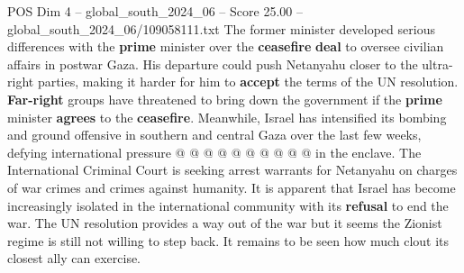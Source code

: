 \begin{textsample}{POS Dim 4 – global\_south\_2024\_06 – Score 25.00 – global\_south\_2024\_06/109058111.txt}
The former minister developed serious differences with the \textbf{prime} minister over the \textbf{ceasefire} \textbf{deal} to oversee civilian affairs in postwar Gaza.
His departure could push Netanyahu closer to the ultra-right parties, making it harder for him to \textbf{accept} the terms of the UN resolution. \textbf{Far-right} groups have threatened to bring down the government if the \textbf{prime} minister \textbf{agrees} to the \textbf{ceasefire}.
Meanwhile, Israel has intensified its bombing and ground offensive in southern and central Gaza over the last few weeks, defying international pressure @ @ @ @ @ @ @ @ @ @ in the enclave.
The International Criminal Court is seeking arrest warrants for Netanyahu on charges of war crimes and crimes against humanity.
It is apparent that Israel has become increasingly isolated in the international community with its \textbf{refusal} to end the war.
The UN resolution provides a way out of the war but it seems the Zionist regime is still not willing to step back.
It remains to be seen how much clout its closest ally can exercise.

\end{textsample}
